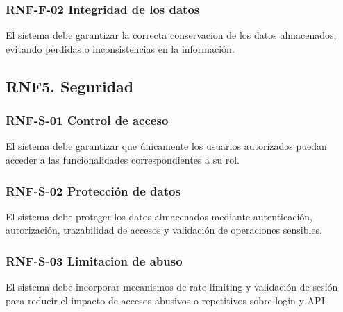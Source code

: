 \vspace{-0.75em}
\subsubsection{RNF-F-02 Integridad de los datos}
\vspace{-1em}

El sistema debe garantizar la correcta conservacion de los datos almacenados, evitando perdidas o inconsistencias en la información.

\subsection{RNF5. Seguridad}

\vspace{-0.75em}
\subsubsection{RNF-S-01 Control de acceso}
\vspace{-1em}

El sistema debe garantizar que únicamente los usuarios autorizados puedan acceder a las funcionalidades correspondientes a su rol.

\vspace{-0.75em}
\subsubsection{RNF-S-02 Protección de datos}
\vspace{-1em}

El sistema debe proteger los datos almacenados mediante autenticación, autorización, trazabilidad de accesos y validación de operaciones sensibles.

\vspace{-0.75em}
\subsubsection{RNF-S-03 Limitacion de abuso}
\vspace{-1em}

El sistema debe incorporar mecanismos de rate limiting y validación de sesión para reducir el impacto de accesos abusivos o repetitivos sobre login y API.

